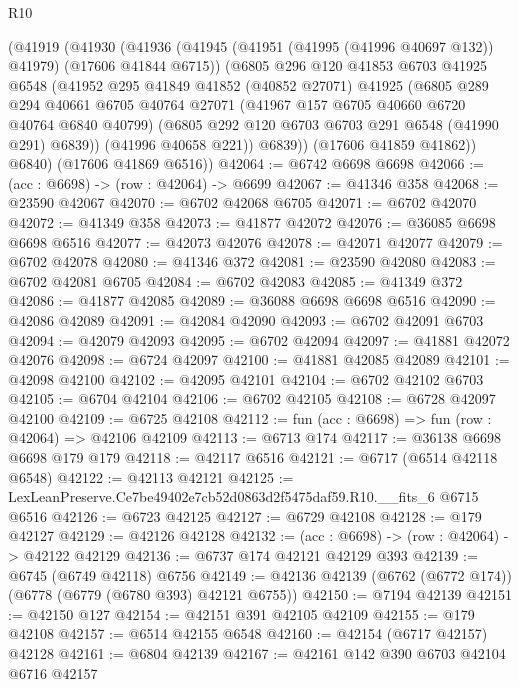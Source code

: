 \begin{lexlean}{R10}
\begin{coremodule}
      (@41919
        (@41930
          (@41936
            (@41945 (@41951 (@41995 (@41996 @40697 @132)) @41979) (@17606 @41844 @6715))
            (@6805
              @296
              @120
              @41853
              @6703
              @41925
              @6548
              (@41952
                @295
                @41849
                @41852
                (@40852 @27071)
                @41925
                (@6805
                  @289
                  @294
                  @40661
                  @6705
                  @40764
                  @27071
                  (@41967 @157 @6705 @40660 @6720 @40764 @6840 @40799)
                  (@6805 @292 @120 @6703 @6703 @291 @6548 (@41990 @291) @6839))
                (@41996 @40658 @221))
              @6839))
          (@17606 @41859 @41862))
        @6840)
      (@17606 @41869 @6516))
@42064 := @6742 @6698 @6698
@42066 := (acc : @6698) -> (row : @42064) -> @6699
@42067 := @41346 @358
@42068 := @23590 @42067
@42070 := @6702 @42068 @6705
@42071 := @6702 @42070
@42072 := @41349 @358
@42073 := @41877 @42072
@42076 := @36085 @6698 @6698 @6516
@42077 := @42073 @42076
@42078 := @42071 @42077
@42079 := @6702 @42078
@42080 := @41346 @372
@42081 := @23590 @42080
@42083 := @6702 @42081 @6705
@42084 := @6702 @42083
@42085 := @41349 @372
@42086 := @41877 @42085
@42089 := @36088 @6698 @6698 @6516
@42090 := @42086 @42089
@42091 := @42084 @42090
@42093 := @6702 @42091 @6703
@42094 := @42079 @42093
@42095 := @6702 @42094
@42097 := @41881 @42072 @42076
@42098 := @6724 @42097
@42100 := @41881 @42085 @42089
@42101 := @42098 @42100
@42102 := @42095 @42101
@42104 := @6702 @42102 @6703
@42105 := @6704 @42104
@42106 := @6702 @42105
@42108 := @6728 @42097 @42100
@42109 := @6725 @42108
@42112 := fun (acc : @6698) => fun (row : @42064) => @42106 @42109
@42113 := @6713 @174
@42117 := @36138 @6698 @6698 @179 @179
@42118 := @42117 @6516
@42121 := @6717 (@6514 @42118 @6548)
@42122 := @42113 @42121
@42125 := LexLeanPreserve.Ce7be49402e7cb52d0863d2f5475daf59.R10.__fits_6 @6715 @6516
@42126 := @6723 @42125
@42127 := @6729 @42108
@42128 := @179 @42127
@42129 := @42126 @42128
@42132 := (acc : @6698) -> (row : @42064) -> @42122 @42129
@42136 := @6737 @174 @42121 @42129 @393
@42139 := @6745 (@6749 @42118) @6756
@42149 := @42136 @42139 (@6762 (@6772 @174)) (@6778 (@6779 (@6780 @393) @42121 @6755))
@42150 := @7194 @42139
@42151 := @42150 @127
@42154 := @42151 @391 @42105 @42109
@42155 := @179 @42108
@42157 := @6514 @42155 @6548
@42160 := @42154 (@6717 @42157) @42128
@42161 := @6804 @42139
@42167 := @42161 @142 @390 @6703 @42104 @6716 @42157

\end{coremodule}
\end{lexlean}
